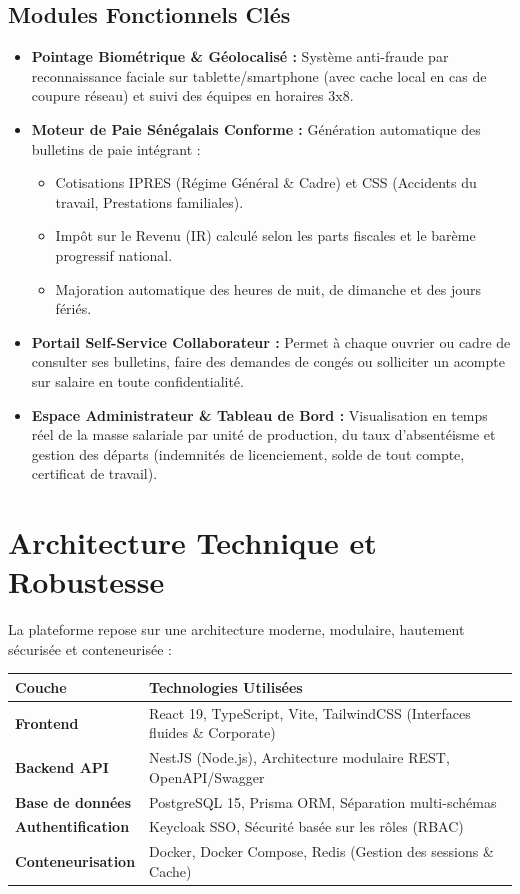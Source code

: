 \documentclass[11pt,a4paper]{article}
\begin{document}
\subsection{Modules Fonctionnels Clés}

\begin{itemize}[leftmargin=1.5em]
    \item \textbf{Pointage Biométrique \& Géolocalisé :} Système anti-fraude par reconnaissance faciale sur tablette/smartphone (avec cache local en cas de coupure réseau) et suivi des équipes en horaires 3x8.
    \item \textbf{Moteur de Paie Sénégalais Conforme :} Génération automatique des bulletins de paie intégrant :
    \begin{itemize}
        \item Cotisations IPRES (Régime Général \& Cadre) et CSS (Accidents du travail, Prestations familiales).
        \item Impôt sur le Revenu (IR) calculé selon les parts fiscales et le barème progressif national.
        \item Majoration automatique des heures de nuit, de dimanche et des jours fériés.
    \end{itemize}
    \item \textbf{Portail Self-Service Collaborateur :} Permet à chaque ouvrier ou cadre de consulter ses bulletins, faire des demandes de congés ou solliciter un acompte sur salaire en toute confidentialité.
    \item \textbf{Espace Administrateur \& Tableau de Bord :} Visualisation en temps réel de la masse salariale par unité de production, du taux d'absentéisme et gestion des départs (indemnités de licenciement, solde de tout compte, certificat de travail).
\end{itemize}

\section{Architecture Technique et Robustesse}
La plateforme repose sur une architecture moderne, modulaire, hautement sécurisée et conteneurisée :

\begin{table}[h!]
\centering
\small
\begin{tabular}{>{\bfseries}ll}
\toprule
Couche & Technologies Utilisées \\
\midrule
Frontend & React 19, TypeScript, Vite, TailwindCSS (Interfaces fluides \& Corporate) \\
Backend API & NestJS (Node.js), Architecture modulaire REST, OpenAPI/Swagger \\
Base de données & PostgreSQL 15, Prisma ORM, Séparation multi-schémas \\
Authentification & Keycloak SSO, Sécurité basée sur les rôles (RBAC) \\
Conteneurisation & Docker, Docker Compose, Redis (Gestion des sessions \& Cache) \\
\bottomrule
\end{tabular}
\end{table}
\end{document}
